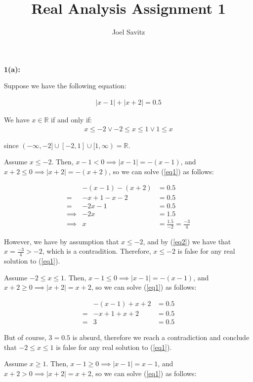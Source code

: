 \documentclass{article}
\title{Real Analysis Assignment 1}
\author{Joel Savitz}
\newcommand{\reals}{\mathbb{R}}
\begin{document}
\maketitle

\textbf{1(a):}

Suppose we have the following equation:

\begin{align} \label{eq1}
	|x-1| + |x+2| = 0.5
\end{align}

We have $x \in \reals $ if and only if:
\begin{align} \label{eq0}
	x \le -2 \lor -2 \le x \le 1 \lor 1 \le x
\end{align}

since $(-\infty,-2] \cup [-2,1] \cup [1,\infty) = \reals$.

Assume $x \le -2$.
Then, $x-1 < 0 \implies |x-1| = -(x-1)$,
and $x+2 \le 0 \implies |x+2| = -(x+2)$,
so we can solve (\ref{eq1}) as follows:

\begin{align}
	& -(x-1) -(x+2) & = 0.5 \\
	= & -x+1 -x-2 & = 0.5 \\
	= & -2x-1 & = 0.5 \\
	\implies & -2x & = 1.5 \\
	\label{eq2} \implies & x & = \frac{1.5}{-2} = \frac{-3}{4}
\end{align}

However, we have by assumption that $x \le -2$,
and by (\ref{eq2}) we have that $x = \frac{-3}{4} > -2$,
which is a contradition.
Therefore, $x \le -2$ is false for any real solution to (\ref{eq1}).

Assume $-2 \le x \le 1$.
Then, $x-1 \le 0 \implies |x-1| = -(x-1)$,
and $x+2 \geq 0 \implies |x+2| = x+2$,
so we can solve (\ref{eq1}) as follows:

\begin{align}
	& -(x-1) + x+2 & = 0.5 \\
	= & -x+1 + x+2 & = 0.5 \\
	= & 3 & = 0.5
\end{align}

But of course, $3 = 0.5$ is absurd,
therefore we reach a contradiction
and conclude that $-2 \le x \le 1$ is false for any real solution to (\ref{eq1}).

Assume $x \geq 1$.
Then, $x-1 \geq 0 \implies |x-1| = x-1$,
and $x+2 > 0 \implies |x+2| = x+2$,
so we can solve (\ref{eq1}) as follows:
\end{document}
